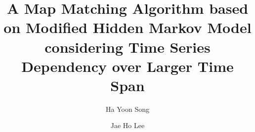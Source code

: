 \documentclass[preprint,12pt]{elsarticle}
\begin{document}
\begin{frontmatter}



\title{A Map Matching Algorithm based on Modified Hidden Markov Model considering Time Series Dependency over Larger Time Span}


\author{Ha Yoon Song}
\author{Jae Ho Lee}
\address{Department of Computer Engineering, Hongik University,\\ 94 Wausan-ro, Mapo-gu, Seoul, South Korea}            


\end{frontmatter}
\end{document}
